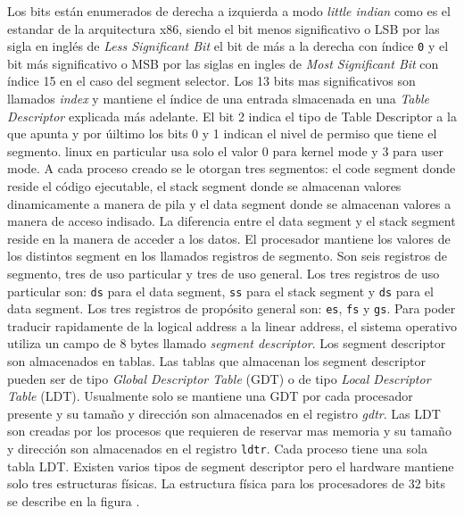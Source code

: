 Los bits están enumerados de derecha a izquierda a modo \emph{little indian}
como es el estandar de la arquitectura x86, siendo el bit menos significativo o
LSB por las sigla en inglés de \emph{Less Significant Bit} el bit de más a la
derecha con índice \texttt{0} y el bit más significativo o MSB por las siglas
en ingles de \emph{Most Significant Bit} con índice 15 en el caso del segment
selector. Los 13 bits mas significativos son llamados \emph{index} y mantiene
el índice de una entrada slmacenada en una \emph{Table Descriptor} explicada
más adelante. El bit 2 indica el tipo de Table Descriptor a la que apunta y por
úiltimo los bits 0 y 1 indican el nivel de permiso que tiene el segmento. linux
en particular usa solo el valor 0 para kernel mode y 3 para user mode. A cada
proceso creado se le otorgan tres segmentos: el code segment donde reside el
código ejecutable, el stack segment donde se almacenan valores dinamicamente a
manera de pila y el data segment donde se almacenan valores a manera de acceso
indisado. La diferencia entre el data segment y el stack segment reside en la
manera de acceder a los datos.  El procesador mantiene los valores de los
distintos segment en los llamados registros de segmento. Son seis registros de
segmento, tres de uso particular y tres de uso general. Los tres registros de
uso particular son: \texttt{ds} para el data segment, \texttt{ss} para el stack
segment y \texttt{ds} para el data segment. Los tres registros de propósito
general son: \texttt{es}, \texttt{fs} y \texttt{gs}.  Para poder traducir
rapidamente de la logical address a la linear address, el sistema operativo
utiliza un campo de 8 bytes llamado \emph{segment descriptor}. Los segment
descriptor son almacenados en tablas. Las tablas que almacenan los segment
descriptor pueden ser de tipo \emph{Global Descriptor Table} (GDT) o de tipo
\emph{Local Descriptor Table} (LDT). Usualmente solo se mantiene una GDT por
cada procesador presente y su tamaño y dirección son almacenados en el registro
\emph{gdtr}. Las LDT son creadas por los procesos que requieren de reservar mas
memoria y su tamaño y dirección son almacenados en el registro
\texttt{ldtr}. Cada proceso tiene una sola tabla LDT. Existen varios tipos de
segment descriptor pero el hardware mantiene solo tres estructuras físicas. La
estructura física para los procesadores de 32 bits se describe en la figura {}.

